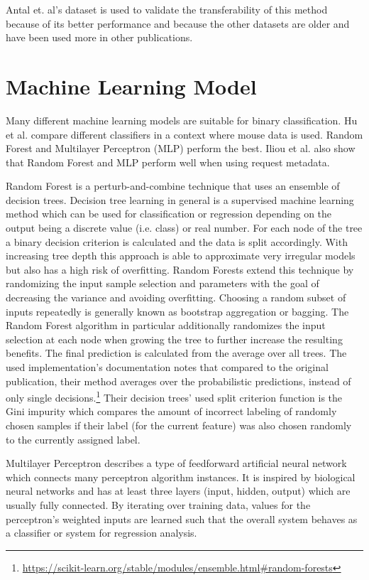 \documentclass[
    fontsize=12pt,
    headings=small,
    parskip=half,           %
    bibliography=totoc,
    numbers=noenddot,       %
    open=any,               %
    final                   %
]{scrreprt}
\begin{document}
Antal et. al's dataset is used to validate the transferability of this method because of its better performance and because the other datasets are older and have been used more in other publications.


\section{Machine Learning Model}

Many different machine learning models are suitable for binary classification. Hu et al. \cite{8275816} compare different classifiers in a context where mouse data is used. Random Forest and Multilayer Perceptron (MLP) perform the best.
Iliou et al. \cite{10.1145/3339252.3339267} also show that Random Forest and MLP perform well when using request metadata.

Random Forest\cite{Breiman2001} is a perturb-and-combine technique that uses an ensemble of decision trees. Decision tree learning in general is a supervised machine learning method which can be used for classification or regression depending on the output being a discrete value (i.e. class) or real number. For each node of the tree a binary decision criterion is calculated and the data is split accordingly. With increasing tree depth this approach is able to approximate very irregular models but also has a high risk of overfitting. Random Forests extend this technique by randomizing the input sample selection and parameters with the goal of decreasing the variance and avoiding overfitting. Choosing a random subset of inputs repeatedly is generally known as bootstrap  aggregation or bagging. The Random Forest algorithm in particular additionally randomizes the input selection at each node when growing the tree to further increase the resulting benefits. The final prediction is calculated from the average over all trees. The used implementation's documentation notes that compared to the original publication, their method averages over the probabilistic predictions, instead of only single decisions.\footnote{\url{https://scikit-learn.org/stable/modules/ensemble.html\#random-forests}} Their decision trees' used split criterion function is the Gini impurity which compares the amount of incorrect labeling of randomly chosen samples if their label (for the current feature) was also chosen randomly to the currently assigned label.

Multilayer Perceptron describes a type of feedforward artificial neural network which connects many perceptron algorithm instances. It is inspired by biological neural networks and has at least three layers (input, hidden, output) which are usually fully connected. By iterating over training data, values for the perceptron's weighted inputs are learned such that the overall system behaves as a classifier or system for regression analysis.
\end{document}
